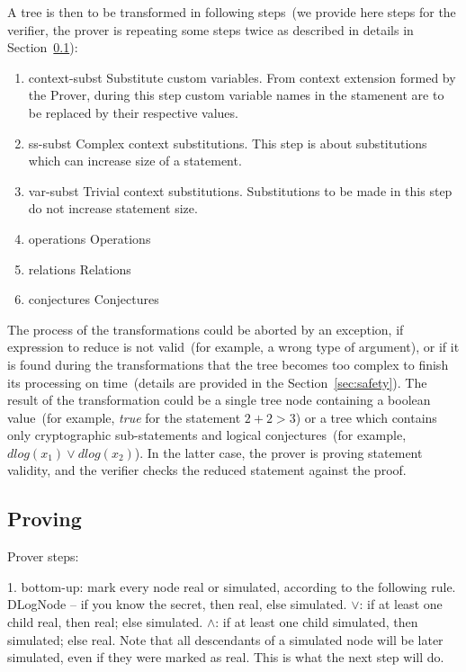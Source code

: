 \documentclass[11pt]{article}
\newcommand{\authnote}[2]{\marginpar{\parbox{\marginparwidth}{\tiny %
  \textsf{#1 {\textcolor{blue}{notes: #2}}}}}%
  \textcolor{blue}{\textbf{\dag}}}
\newcommand{\authnote}[2]{
  \textsf{#1 \textcolor{blue}{: #2}}}
\newcommand{\authnote}[2]{}
\newcommand{\knote}[1]{{\authnote{\textcolor{green}{kushti notes}}{#1}}}
\begin{document}
A tree is then to be transformed in following steps~(we provide here steps for the verifier, the prover is repeating some steps twice as described in details in Section~\ref{sec:proving}): 

\knote{all transformations are bottom-up}
\begin{enumerate}
	\item{context-subst} Substitute custom variables. From context extension formed by the Prover, during this step custom variable names in the stamenent are to be replaced by their respective values.
	\item{ss-subst} Complex context substitutions. This step is about substitutions which can increase size of a statement. 
                    \knote{$self.script, tx.outbytes, tx.output, tx.has\_output$}
	\item{var-subst} Trivial context substitutions. Substitutions to be made in this step do not increase statement size. 
                    \knote{$height, self.height, self.amount$}
	\item{operations} Operations 
	\item{relations} Relations
	\item{conjectures} Conjectures
\end{enumerate}

The process of the transformations could be aborted by an exception, if expression to reduce is not valid~(for example, a wrong type of argument), or if it is found during the transformations that the tree becomes too complex to finish its processing on time~(details are provided in the Section~\ref{sec:safety}). The result of the transformation could be a single tree node containing a boolean value~(for example, {\em true} for the statement $2 + 2 > 3$) or a tree which contains only cryptographic sub-statements and logical conjectures~(for example, $dlog(x_1) \lor dlog(x_2)$). In the latter case, the prover is proving statement validity, and the verifier checks the reduced statement against the proof.


\subsection{Proving}
\label{sec:proving}

\knote{Raw text from Leo's email, rewrite}

Prover steps:
    
    1. bottom-up: mark every node real or simulated, according to the following rule. DLogNode -- if you know the secret,
     then real, else simulated. $\lor$: if at least one child real, then real; else simulated. $\land$: if at least one child
     simulated, then simulated; else real. Note that all descendants of a simulated node will be later simulated, even
     if they were marked as real. This is what the next step will do.
    
\end{document}
